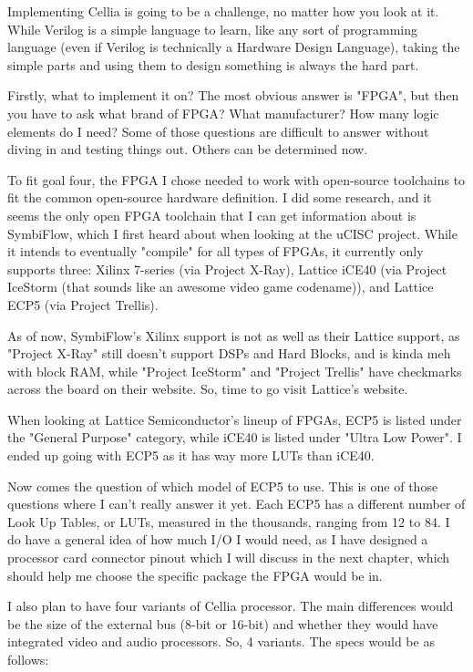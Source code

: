 \documentclass[letterpaper,12pt]{book}
\begin{document}
Implementing Cellia is going to be a challenge, no matter how you look at it. While Verilog is a simple language to learn, like any sort of programming language (even if Verilog is technically a Hardware Design Language), taking the simple parts and using them to design something is always the hard part.

Firstly, what to implement it on? The most obvious answer is "FPGA", but then you have to ask what brand of FPGA? What manufacturer? How many logic elements do I need? Some of those questions are difficult to answer without diving in and testing things out. Others can be determined now.

To fit goal four, the FPGA I chose needed to work with open-source toolchains to fit the common open-source hardware definition. I did some research, and it seems the only open FPGA toolchain that I can get information about is SymbiFlow, which I first heard about when looking at the uCISC project. While it intends to eventually "compile" for all types of FPGAs, it currently only supports three: Xilinx 7-series (via Project X-Ray), Lattice iCE40 (via Project IceStorm (that sounds like an awesome video game codename)), and Lattice ECP5 (via Project Trellis).

As of now, SymbiFlow's Xilinx support is not as well as their Lattice support, as "Project X-Ray" still doesn't support DSPs and Hard Blocks, and is kinda meh with block RAM, while "Project IceStorm" and "Project Trellis" have checkmarks across the board on their website. So, time to go visit Lattice's website.

When looking at Lattice Semiconductor's lineup of FPGAs, ECP5 is listed under the "General Purpose" category, while iCE40 is listed under "Ultra Low Power". I ended up going with ECP5 as it has way more LUTs than iCE40.

Now comes the question of which model of ECP5 to use. This is one of those questions where I can't really answer it yet. Each ECP5 has a different number of Look Up Tables, or LUTs, measured in the thousands, ranging from 12 to 84. I do have a general idea of how much I/O I would need, as I have designed a processor card connector pinout which I will discuss in the next chapter, which should help me choose the specific package the FPGA would be in.

I also plan to have four variants of Cellia processor. The main differences would be the size of the external bus (8-bit or 16-bit) and whether they would have integrated video and audio processors. So, 4 variants. The specs would be as follows:
\end{document}

